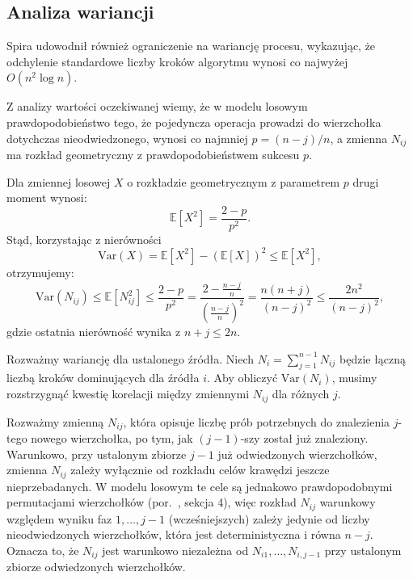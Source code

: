 \subsection*{Analiza wariancji}

Spira udowodnił również ograniczenie na wariancję procesu, wykazując,
że odchylenie standardowe liczby kroków algorytmu wynosi co najwyżej
$O(n^2 \log n)$.

Z analizy wartości oczekiwanej wiemy,
że w modelu losowym prawdopodobieństwo tego, że pojedyncza operacja
prowadzi do wierzchołka dotychczas nieodwiedzonego, wynosi co
najmniej $p = (n-j)/n$, a zmienna $N_{ij}$
ma rozkład geometryczny z prawdopodobieństwem sukcesu $p$.

Dla zmiennej losowej $X$ o rozkładzie geometrycznym z parametrem $p$ drugi moment wynosi:
\[
\mathbb{E}[X^2] = \frac{2 - p}{p^2}.
\]
Stąd, korzystając z nierówności
\[
\mathrm{Var}(X) = \mathbb{E}[X^2] - (\mathbb{E}[X])^2
\leq \mathbb{E}[X^2],
\] otrzymujemy:
\[
\mathrm{Var}(N_{ij})
\leq \mathbb{E}[N_{ij}^2]
\leq \frac{2 - p}{p^2}
= \frac{2 - \frac{n-j}{n}}{\left(\frac{n-j}{n}\right)^2}
= \frac{n(n+j)}{(n-j)^2}
\leq \frac{2n^2}{(n-j)^2},
\]
gdzie ostatnia nierówność wynika z $n + j \leq 2n$.

Rozważmy wariancję dla ustalonego źródła.
Niech $N_i = \sum_{j=1}^{n-1} N_{ij}$ będzie łączną liczbą kroków
dominujących dla źródła $i$. Aby obliczyć $\mathrm{Var}(N_i)$,
musimy rozstrzygnąć kwestię korelacji między zmiennymi $N_{ij}$
dla różnych $j$.

Rozważmy zmienną $N_{ij}$, która opisuje liczbę prób potrzebnych
do znalezienia $j$-tego nowego wierzchołka, po tym, jak
$(j-1)$-szy został już znaleziony. Warunkowo, przy ustalonym zbiorze
$j-1$ już odwiedzonych wierzchołków, zmienna $N_{ij}$ zależy
wyłącznie od rozkładu celów krawędzi jeszcze nieprzebadanych.
W modelu losowym te cele są jednakowo prawdopodobnymi permutacjami
wierzchołków (por.\ \cite{Spira1973}, sekcja 4), więc rozkład
$N_{ij}$ warunkowy względem wyniku faz $1, \ldots, j-1$ (wcześniejszych) zależy
jedynie od liczby nieodwiedzonych wierzchołków, która jest
deterministyczna i równa $n - j$. Oznacza to, że $N_{ij}$ jest
warunkowo niezależna od $N_{i1}, \ldots, N_{i,j-1}$ przy
ustalonym zbiorze odwiedzonych wierzchołków.

